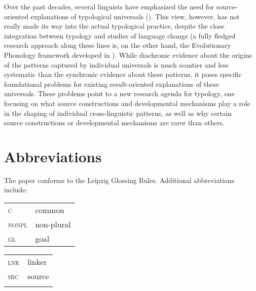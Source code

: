 \documentclass[output=paper]{langsci/langscibook}
\begin{document}
Over the past decades, several linguists have emphasized the need for
source-oriented explanations of typological universals (\citealt{Bybee1988,Bybee2006,Bybee2008,Aristar1991,Gildea1998,Creissels2008,Otareferential,Otacompetingmotivations,Otadependencies,Anderson2016}). This
view, however, has not really made its way into the actual typological
practice, despite the close integration between typology and studies
of language change (a fully fledged research approach along these lines is, on
the other hand, the Evolutionary Phonology framework developed in
\citealt{Blevins2004}). While diachronic evidence about the origins
of the patterns captured by individual universals is much scantier and
less systematic than the synchronic evidence about these patterns, 
 it poses specific foundational problems for existing result-oriented explanations of these universals. These problems point to a
new research agenda for typology, one  focusing on what source constructions and developmental
mechanisms play a role in the shaping of individual cross-linguistic
patterns, as well as why certain source
constructions or developmental mechanisms are rarer than others.

\section*{Abbreviations}

The paper conforms to the Leipzig Glossing Rules. Additional abbreviations include:\smallskip
  
\begin{tabularx}{.45\textwidth}{lQ}
\textsc{c} &{common}              \\
\textsc{nonpl}&{non-plural}       \\
\textsc{gl}&{goal}                \\
\end{tabularx}
\begin{tabularx}{.45\textwidth}{lQ}
\textsc{lnk}&{linker}              \\
\textsc{src}&{source}              \\
\\
\end{tabularx}


\sloppy
\printbibliography[heading=subbibliography,notkeyword=this] 
\end{document}
